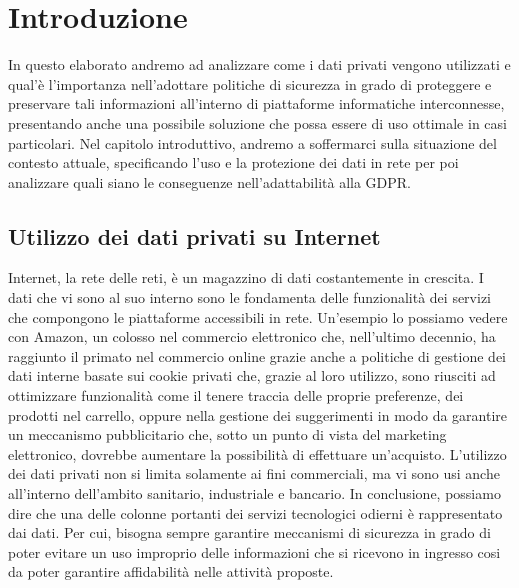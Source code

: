 \chapter{Introduzione}
In questo elaborato andremo ad analizzare come i dati privati vengono utilizzati e qual'è l'importanza nell'adottare politiche di sicurezza in grado di proteggere e preservare tali informazioni all'interno di piattaforme informatiche interconnesse, presentando anche una possibile soluzione che possa essere di uso ottimale in casi particolari. Nel capitolo introduttivo, andremo a soffermarci sulla situazione del contesto attuale, specificando l'uso e la protezione dei dati in rete per poi analizzare quali siano le conseguenze nell'adattabilità alla GDPR. 
\section{Utilizzo dei dati privati su Internet}
Internet, la rete delle reti, è un magazzino di dati costantemente in crescita. I dati che vi sono al suo interno sono le fondamenta delle funzionalità dei servizi che compongono le piattaforme accessibili in rete. Un'esempio lo possiamo vedere con Amazon, un colosso nel commercio elettronico che, nell'ultimo decennio, ha raggiunto il primato nel commercio online grazie anche a politiche di gestione dei dati interne basate sui cookie privati che, grazie al loro utilizzo, sono riusciti ad ottimizzare funzionalità come il tenere traccia delle proprie preferenze, dei prodotti nel carrello, oppure nella gestione dei suggerimenti in modo da garantire un meccanismo pubblicitario che, sotto un punto di vista del marketing elettronico, dovrebbe aumentare la possibilità di effettuare un'acquisto. L'utilizzo dei dati privati non si limita solamente ai fini commerciali, ma vi sono usi anche all'interno dell'ambito sanitario, industriale e bancario. 
In conclusione, possiamo dire che una delle colonne portanti dei servizi tecnologici odierni è rappresentato dai dati. Per cui, bisogna sempre garantire meccanismi di sicurezza in grado di poter evitare un uso improprio delle informazioni che si ricevono in ingresso cosi da poter garantire affidabilità nelle attività proposte. 
